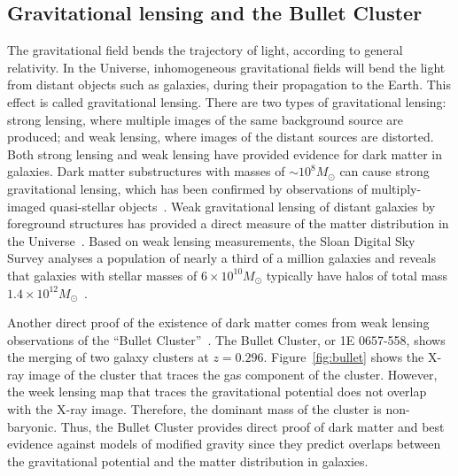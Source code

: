 \documentclass[doublespace,nopageskip]{VTthesis}
\begin{document}
\subsection{Gravitational lensing and the Bullet Cluster}

The gravitational field bends the trajectory of light, according to general relativity. In the Universe, inhomogeneous gravitational fields will bend the light from distant objects such as galaxies, during their propagation to the Earth. This effect is called gravitational lensing.
{There are two types of gravitational lensing: strong lensing, where multiple images of the same background source are produced; and weak lensing, where images of the distant sources are distorted. Both strong lensing and weak lensing have provided evidence for dark matter in galaxies. Dark matter substructures with masses of $\sim 10^8 M_\odot$ can cause strong gravitational lensing, which has been confirmed by observations of multiply-imaged quasi-stellar objects~\cite{2003MNRAS.339..607M,2004ApJ...607...43M}.}
Weak gravitational lensing of distant galaxies by foreground structures has provided a direct measure of the matter distribution in the Universe~\cite{2002NewAR..46..767H}. Based on weak lensing measurements,  the Sloan Digital Sky Survey {analyses a population of nearly a third of a million galaxies and reveals that galaxies with stellar masses of $6\times 10^{10} M_\odot$ typically have halos of total mass $1.4\times 10^{12} M_\odot$~\cite{2006ApJS..162...38A}}. 

Another direct proof of the existence of dark matter comes from weak lensing observations of the ``Bullet Cluster''~\cite{2006ApJ...648L.109C}. The Bullet Cluster, or 1E 0657-558, shows the merging of two galaxy clusters at $z=0.296$. Figure~\ref{fig:bullet} shows the X-ray image of the cluster that traces the gas component of the cluster. However, the week lensing map that traces the gravitational potential does not overlap with the X-ray image. Therefore, the dominant mass of the cluster is non-baryonic. Thus, the Bullet Cluster provides direct proof of dark matter {and best evidence against models of modified gravity since they predict overlaps between the gravitational potential and the matter distribution in galaxies.}
\end{document}
